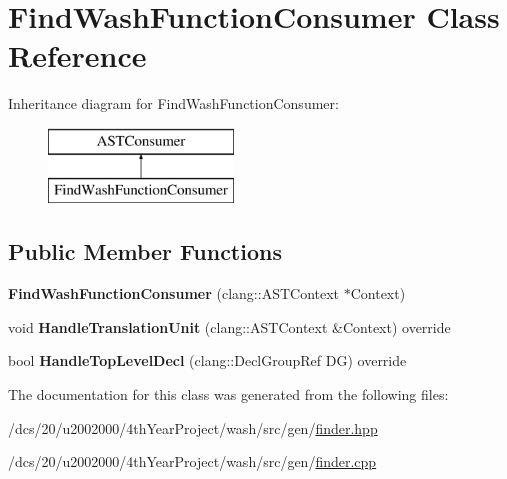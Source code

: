 \hypertarget{classFindWashFunctionConsumer}{}\section{Find\+Wash\+Function\+Consumer Class Reference}
\label{classFindWashFunctionConsumer}
Inheritance diagram for Find\+Wash\+Function\+Consumer\+:\begin{figure}[H]
\begin{center}
\leavevmode
\includegraphics[height=2.000000cm]{classFindWashFunctionConsumer}
\end{center}
\end{figure}
\subsection*{Public Member Functions}
\begin{DoxyCompactItemize}
\item 
\mbox{\label{classFindWashFunctionConsumer_a98780796544492f4124d6ae75a50f711}} 
{\bfseries Find\+Wash\+Function\+Consumer} (clang\+::\+A\+S\+T\+Context $\ast$Context)
\item 
\mbox{\label{classFindWashFunctionConsumer_a31623a8aa3a9a74cee3fd73ebf53aec3}} 
void {\bfseries Handle\+Translation\+Unit} (clang\+::\+A\+S\+T\+Context \&Context) override
\item 
\mbox{\label{classFindWashFunctionConsumer_a3e833697a58085ed53f0407a3b82a64f}} 
bool {\bfseries Handle\+Top\+Level\+Decl} (clang\+::\+Decl\+Group\+Ref DG) override
\end{DoxyCompactItemize}


The documentation for this class was generated from the following files\+:\begin{DoxyCompactItemize}
\item 
/dcs/20/u2002000/4th\+Year\+Project/wash/src/gen/\mbox{\hyperlink{finder_8hpp}{finder.\+hpp}}\item 
/dcs/20/u2002000/4th\+Year\+Project/wash/src/gen/\mbox{\hyperlink{finder_8cpp}{finder.\+cpp}}\end{DoxyCompactItemize}
